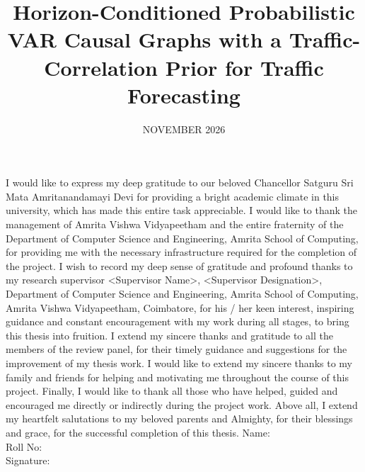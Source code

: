\documentclass[MTech]{ugthesis}
\begin{document}

\title{Horizon-Conditioned Probabilistic VAR Causal Graphs with a Traffic-Correlation Prior for Traffic Forecasting} %
\firstauthorregno{[CB.SC.P2CSE25001]}
\date{NOVEMBER 2026} %

\maketitle
\certificate
\acknowledgements
\normalfont
I would like to express my deep gratitude to our beloved Chancellor Satguru Sri Mata Amritanandamayi Devi for providing a bright academic climate in this university, which has made this entire task appreciable. I would like to thank the management of Amrita Vishwa Vidyapeetham and the entire fraternity of the Department of Computer Science and Engineering, Amrita School of Computing, for providing me with the necessary infrastructure required for the completion of the project.
I wish to record my deep sense of gratitude and profound thanks to my research supervisor <Supervisor Name>, <Supervisor Designation>, Department of Computer Science and Engineering, Amrita School of Computing, Amrita Vishwa Vidyapeetham, Coimbatore, for his / her keen interest, inspiring guidance and constant encouragement with my work during all stages, to bring this thesis into fruition.
I extend my sincere thanks and gratitude to all the members of the review panel, for their timely guidance and suggestions for the improvement of my thesis work.
I would like to extend my sincere thanks to my family and friends for helping and motivating me throughout the course of this project.
Finally, I would like to thank all those who have helped, guided and encouraged me directly or indirectly during the project work.
Above all, I extend my heartfelt salutations to my beloved parents and Almighty, for their blessings and grace, for the successful completion of this thesis.
\vskip 25pt
\noindent
Name:\\
Roll No:\\
Signature:\\
\end{document}

